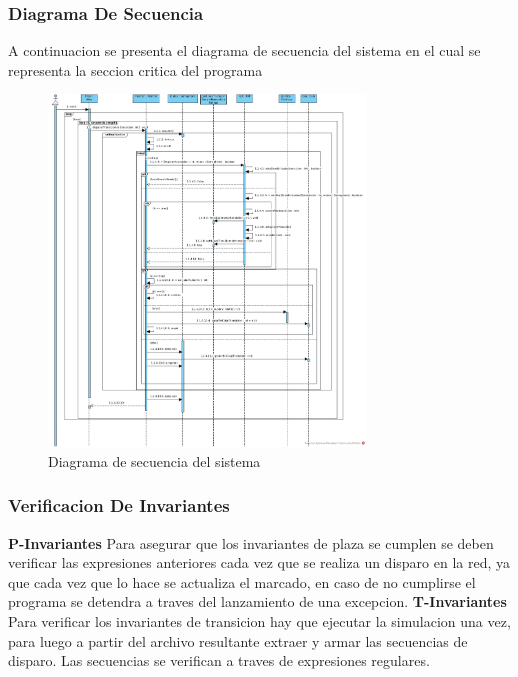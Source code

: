 \documentclass{article}
\begin{document}
		\subsubsection{Diagrama De Secuencia}
		A continuacion se presenta el diagrama de secuencia del sistema en el cual 
		se representa la seccion critica del programa
		\begin{figure}[h]
			\centering
			\includegraphics[width=0.75\textwidth]{Diagrama_de_secuencia}
			\caption{Diagrama de secuencia del sistema}
			\label{fig:mesh3}
		\end{figure}
		\subsubsection{Verificacion De Invariantes}
		\textbf{P-Invariantes} \newline
		Para asegurar que los invariantes de plaza se cumplen se deben verificar las 
		expresiones anteriores cada vez que se realiza un disparo en la red, ya que 
		cada vez que lo hace se actualiza el marcado, en caso de no cumplirse el programa
		se detendra a traves del lanzamiento de una excepcion.\newline
		\textbf{T-Invariantes} \newline
		Para verificar los invariantes de transicion hay que ejecutar la simulacion una vez, 
		para luego a partir del archivo resultante extraer y armar las secuencias de disparo.
		Las secuencias se verifican a traves de expresiones regulares.		 
		
\end{document}
